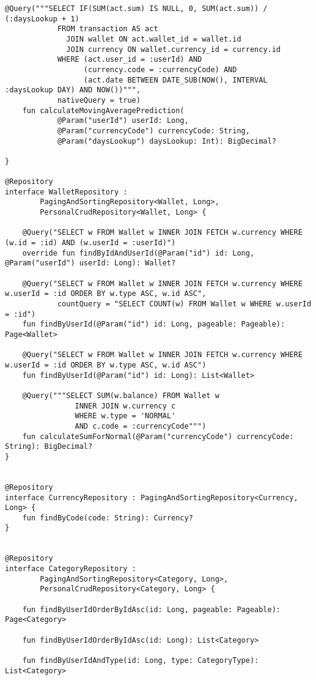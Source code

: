 \begin{lstlisting}[style = ktstyle]
    @Query("""SELECT IF(SUM(act.sum) IS NULL, 0, SUM(act.sum)) / (:daysLookup + 1)
            FROM transaction AS act
              JOIN wallet ON act.wallet_id = wallet.id
              JOIN currency ON wallet.currency_id = currency.id
            WHERE (act.user_id = :userId) AND
                  (currency.code = :currencyCode) AND
                  (act.date BETWEEN DATE_SUB(NOW(), INTERVAL :daysLookup DAY) AND NOW())""",
            nativeQuery = true)
    fun calculateMovingAveragePrediction(
            @Param("userId") userId: Long,
            @Param("currencyCode") currencyCode: String,
            @Param("daysLookup") daysLookup: Int): BigDecimal?

}

@Repository
interface WalletRepository :
        PagingAndSortingRepository<Wallet, Long>,
        PersonalCrudRepository<Wallet, Long> {

    @Query("SELECT w FROM Wallet w INNER JOIN FETCH w.currency WHERE (w.id = :id) AND (w.userId = :userId)")
    override fun findByIdAndUserId(@Param("id") id: Long, @Param("userId") userId: Long): Wallet?

    @Query("SELECT w FROM Wallet w INNER JOIN FETCH w.currency WHERE w.userId = :id ORDER BY w.type ASC, w.id ASC",
            countQuery = "SELECT COUNT(w) FROM Wallet w WHERE w.userId = :id")
    fun findByUserId(@Param("id") id: Long, pageable: Pageable): Page<Wallet>

    @Query("SELECT w FROM Wallet w INNER JOIN FETCH w.currency WHERE w.userId = :id ORDER BY w.type ASC, w.id ASC")
    fun findByUserId(@Param("id") id: Long): List<Wallet>

    @Query("""SELECT SUM(w.balance) FROM Wallet w
                INNER JOIN w.currency c
                WHERE w.type = 'NORMAL'
                AND c.code = :currencyCode""")
    fun calculateSumForNormal(@Param("currencyCode") currencyCode: String): BigDecimal?
}


@Repository
interface CurrencyRepository : PagingAndSortingRepository<Currency, Long> {
    fun findByCode(code: String): Currency?
}


@Repository
interface CategoryRepository :
        PagingAndSortingRepository<Category, Long>,
        PersonalCrudRepository<Category, Long> {

    fun findByUserIdOrderByIdAsc(id: Long, pageable: Pageable): Page<Category>

    fun findByUserIdOrderByIdAsc(id: Long): List<Category>

    fun findByUserIdAndType(id: Long, type: CategoryType): List<Category>


\end{lstlisting}
